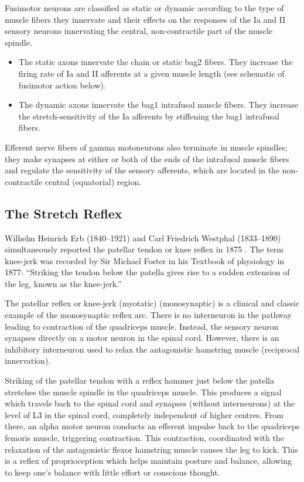 Fusimotor neurons are classified as static or dynamic according to the type of muscle fibers they innervate and their effects on the responses of the Ia and II sensory neurons innervating the central, non-contractile part of the muscle spindle.

\begin{itemize}
\tightlist
\item
  The static axons innervate the chain or static bag2 fibers. They increase the firing rate of Ia and II afferents at a given muscle length (see schematic of fusimotor action below).
\item
  The dynamic axons innervate the bag1 intrafusal muscle fibers. They increase the stretch-sensitivity of the Ia afferents by stiffening the bag1 intrafusal fibers.
\end{itemize}

Efferent nerve fibers of gamma motoneurons also terminate in muscle spindles; they make synapses at either or both of the ends of the intrafusal muscle fibers and regulate the sensitivity of the sensory afferents, which are located in the non-contractile central (equatorial) region.

\hypertarget{the-stretch-reflex}{%
\subsection{The Stretch Reflex}\label{the-stretch-reflex}}

Wilhelm Heinrich Erb (1840--1921) and Carl Friedrich Westphal (1833--1890) simultaneously reported the patellar tendon or knee reflex in 1875 . The term knee-jerk was recorded by Sir Michael Foster in his Textbook of physiology in 1877: ``Striking the tendon below the patella gives rise to a sudden extension of the leg, known as the knee-jerk.''

The patellar reflex or knee-jerk (myotatic) (monosynaptic) is a clinical and classic example of the monosynaptic reflex arc. There is no interneuron in the pathway leading to contraction of the quadriceps muscle. Instead, the sensory neuron synapses directly on a motor neuron in the spinal cord. However, there is an inhibitory interneuron used to relax the antagonistic hamstring muscle (reciprocal innervation).

Striking of the patellar tendon with a reflex hammer just below the patella stretches the muscle spindle in the quadriceps muscle. This produces a signal which travels back to the spinal cord and synapses (without interneurons) at the level of L3 in the spinal cord, completely independent of higher centres. From there, an alpha motor neuron conducts an efferent impulse back to the quadriceps femoris muscle, triggering contraction. This contraction, coordinated with the relaxation of the antagonistic flexor hamstring muscle causes the leg to kick. This is a reflex of proprioception which helps maintain posture and balance, allowing to keep one's balance with little effort or conscious thought.

